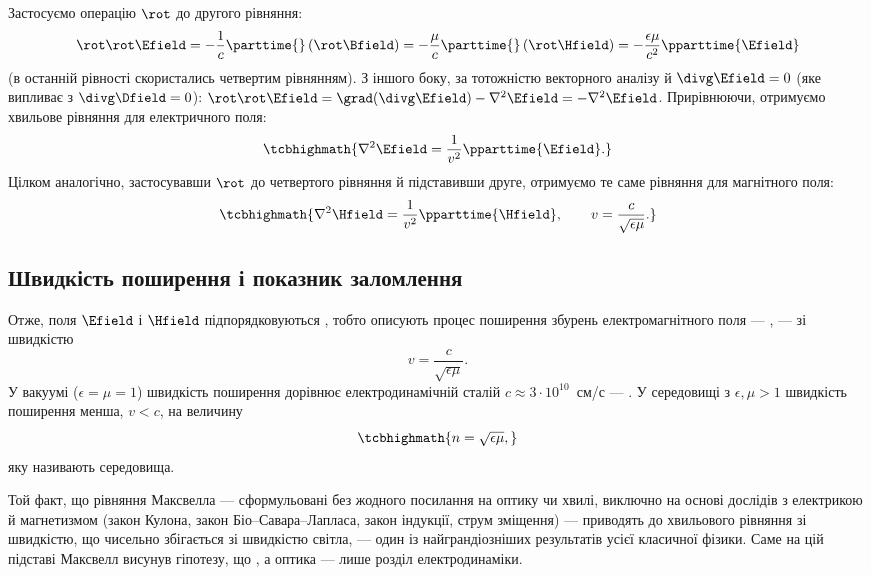Застосуємо операцію $\rot$ до другого рівняння:
\begin{equation*}
	\rot\rot\Efield = -\frac1c\parttime{}\left(\rot\Bfield\right) = -\frac\mu{c}\parttime{}\left(\rot\Hfield\right) = -\frac{\epsilon\mu}{c^2}\pparttime{\Efield}
\end{equation*}
(в останній рівності скористались четвертим рівнянням). З іншого боку, за тотожністю векторного аналізу й $\divg\Efield=0$ (яке випливає з
$\divg\Dfield=0$): $\rot\rot\Efield = \grad(\divg\Efield)-\nabla^2\Efield = -\nabla^2\Efield$. Прирівнюючи, отримуємо хвильове рівняння для
електричного поля:
\begin{equation}\label{eq:WaveEqE}
\tcbhighmath{
	\nabla^2\Efield = \frac1{v^2}\pparttime{\Efield}.
}
\end{equation}
Цілком аналогічно, застосувавши $\rot$ до четвертого рівняння й підставивши друге, отримуємо те саме рівняння для магнітного поля:
\begin{equation}\label{eq:WaveEqH}
	\tcbhighmath{
		\nabla^2\Hfield = \frac1{v^2}\pparttime{\Hfield}, \qquad v = \frac{c}{\sqrt{\epsilon\mu}}.
	}
\end{equation}

\subsection*{Швидкість поширення і показник заломлення}

Отже, поля $\Efield$ і $\Hfield$ підпорядковуються , тобто описують процес поширення збурень електромагнітного поля
--- , --- зі швидкістю
\begin{equation}\label{eq:WaveSpeed}
	v = \frac{c}{\sqrt{\epsilon\mu}}.
\end{equation}
У вакуумі ($\epsilon=\mu=1$) швидкість поширення дорівнює електродинамічній сталій $c\approx3\cdot10^{10}$~см/с --- . У
середовищі з $\epsilon,\mu>1$ швидкість поширення менша, $v<c$, на величину
\begin{equation}\label{eq:RefractiveIndex}
	\tcbhighmath{
		n = \sqrt{\epsilon\mu},
	}
\end{equation}
яку називають  середовища.

\begin{Attention}
	Той факт, що рівняння Максвелла --- сформульовані без жодного посилання на оптику чи хвилі, виключно на основі дослідів з електрикою й
	магнетизмом (закон Кулона, закон Біо--Савара--Лапласа, закон індукції, струм зміщення) ---  приводять до хвильового
	рівняння зі швидкістю, що чисельно збігається зі швидкістю світла, --- один із найграндіозніших результатів усієї класичної фізики. Саме на
	цій підставі Максвелл висунув гіпотезу, що , а оптика --- лише розділ електродинаміки.
\end{Attention}

